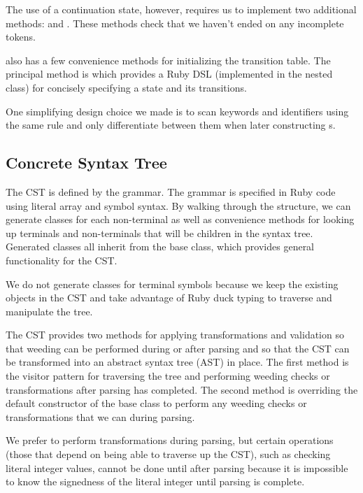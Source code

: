 \documentclass[pdftex,11pt,a4paper]{article}
\begin{document}
The use of a continuation state, however, requires us to implement two
additional  methods:  and
. These methods check that we haven't
ended on any incomplete tokens.

 also has a few convenience methods for initializing the
transition table. The principal method is  which provides a
Ruby DSL (implemented in the  nested class) for
concisely specifying a state and its transitions.

One simplifying design choice we made is to scan keywords and
identifiers using the same rule and only differentiate between them
when later constructing s.

\subsection{Concrete Syntax Tree}

The CST is defined by the grammar. The grammar is specified in Ruby
code using literal array and symbol syntax. By walking through the
structure, we can generate classes for each non-terminal as well as
convenience methods for looking up terminals and non-terminals that
will be children in the syntax tree. Generated classes all inherit
from the  base class, which provides general
functionality for the CST.

We do not generate classes for terminal symbols because we keep the
existing  objects in the CST and take advantage of
Ruby duck typing to traverse and manipulate the tree.

The CST provides two methods for applying transformations and validation
so that weeding can be performed during or after parsing and so that
the CST can be transformed into an abstract syntax tree (AST) in
place. The first method is the visitor pattern for traversing the tree and
performing weeding checks or transformations after parsing has
completed. The second method is overriding the default constructor of
the base class to perform any weeding checks or transformations that
we can during parsing.

We prefer to perform transformations during parsing, but certain
operations (those that depend on being able to traverse up the CST),
such as checking literal integer values, cannot be done until after
parsing because it is impossible to know the signedness of the literal
integer until parsing is complete.
\end{document}
